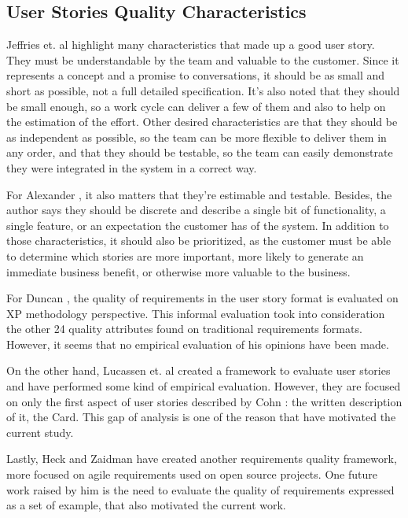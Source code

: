 \subsection{User Stories Quality Characteristics}

Jeffries et. al \cite{Jeffries_2000} highlight many characteristics that made up a good user story. They must be understandable by the team and valuable to the customer. Since it represents a concept and a promise to conversations, it should be as small and short as possible, not a full detailed specification. It's also noted that they should be small enough, so a work cycle can deliver a few of them and also to help on the estimation of the effort. Other desired characteristics are that they should be as independent as possible, so the team can be more flexible to deliver them in any order, and that they should be testable, so the team can easily demonstrate they were integrated in the system in a correct way.

For Alexander \cite{Alexander_2004}, it also matters that they're estimable and testable. Besides, the author says they should be discrete and describe a single bit of functionality, a single feature, or an expectation the customer has of the system. In addition to those characteristics, it should also be prioritized, as the customer must be able to determine which stories are more important, more likely to generate an immediate business benefit, or otherwise more valuable to the business.

For Duncan \cite{Duncan_2001}, the quality of requirements in the user story format is evaluated on XP methodology perspective. This informal evaluation took into consideration the other 24 quality attributes found on traditional requirements formats. However, it seems that no empirical evaluation of his opinions have been made.

On the other hand, Lucassen et. al \cite{Lucassen_et_dot_al_2015} created a framework to evaluate user stories and have performed some kind of empirical evaluation. However, they are focused on only the first aspect of user stories described by Cohn \cite{Cohn_2004}: the written description of it, the Card. This gap of analysis is one of the reason that have motivated the current study.

Lastly, Heck and Zaidman \cite{Heck_and_Zaidman_2015} have created another requirements quality framework, more focused on agile requirements used on open source projects. One future work raised by him is the need to evaluate the quality of requirements expressed as a set of example, that also motivated the current work.

